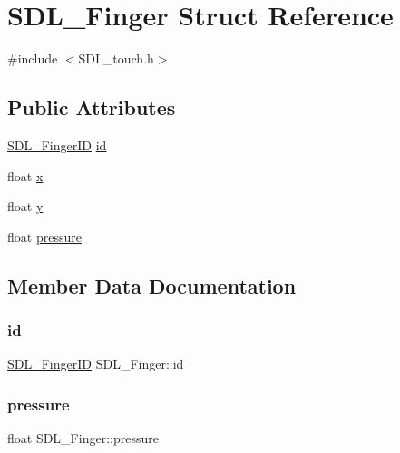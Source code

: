 \hypertarget{struct_s_d_l___finger}{}\section{S\+D\+L\+\_\+\+Finger Struct Reference}
\label{struct_s_d_l___finger}


{\ttfamily \#include $<$S\+D\+L\+\_\+touch.\+h$>$}

\subsection*{Public Attributes}
\begin{DoxyCompactItemize}
\item 
\hyperlink{_s_d_l__touch_8h_a5fa58141f78415ca09645af359ad2250}{S\+D\+L\+\_\+\+Finger\+ID} \hyperlink{struct_s_d_l___finger_a3cec630146eeec5bd6299a9387a6f16a}{id}
\item 
float \hyperlink{struct_s_d_l___finger_ab91dfbd03c3215560457fef44e1c7755}{x}
\item 
float \hyperlink{struct_s_d_l___finger_a0a2c7a06ae641940111e03801c672cf9}{y}
\item 
float \hyperlink{struct_s_d_l___finger_a0ecb50c7fd699d59899ac60c941bdee6}{pressure}
\end{DoxyCompactItemize}


\subsection{Member Data Documentation}
\mbox{\label{struct_s_d_l___finger_a3cec630146eeec5bd6299a9387a6f16a}} 
\subsubsection{\texorpdfstring{id}{id}}
{\footnotesize\ttfamily \hyperlink{_s_d_l__touch_8h_a5fa58141f78415ca09645af359ad2250}{S\+D\+L\+\_\+\+Finger\+ID} S\+D\+L\+\_\+\+Finger\+::id}

\mbox{\label{struct_s_d_l___finger_a0ecb50c7fd699d59899ac60c941bdee6}} 
\subsubsection{\texorpdfstring{pressure}{pressure}}
{\footnotesize\ttfamily float S\+D\+L\+\_\+\+Finger\+::pressure}

